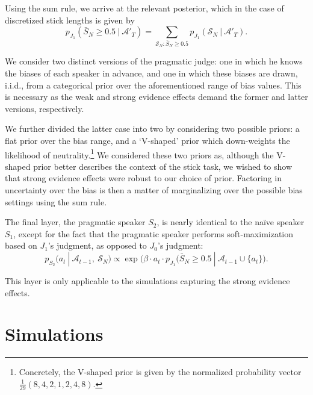\documentclass[10pt,letterpaper]{article}
\begin{document}
Using the sum rule, we arrive at the relevant posterior, which in the case of discretized stick lengths is given by
\begin{equation}
	p_{J_1} ( \bar{S}_N \ge 0.5 \ | \ \mathcal{A}'_T ) = \sum_{\mathcal{S}_N \colon \bar{S}_N \ge 0.5} p_{J_1} (\mathcal{S}_N \ | \ \mathcal{A}'_T).
\end{equation}

We consider two distinct versions of the pragmatic judge: one in which he knows the biases of each speaker in advance, and
one in which these biases are drawn, i.i.d., from a categorical prior over the aforementioned range of bias values. This is 
necessary as the weak and strong evidence effects demand the former and latter versions, respectively. 

We further divided the latter case into two by considering two possible priors: a flat prior over the bias range, and a `V-shaped' prior which down-weights 
the likelihood of neutrality.\footnote{Concretely, the V-shaped prior is given by the normalized probability vector $\frac{1}{29} (8, 4, 2, 1, 2, 4, 8)$.} 
We considered these two priors as, although the V-shaped prior better describes the context of the stick task, we wished to show 
that strong evidence effects were robust to our choice of prior. Factoring in uncertainty over the bias is then a matter of 
marginalizing over the possible bias settings using the sum rule.

The final layer, the pragmatic speaker $S_2$, is nearly identical to the na\"ive speaker $S_1$, except for the fact that
the pragmatic speaker performs soft-maximization based on $J_1$'s judgment, as opposed to $J_0$'s judgment:
\begin{equation}
	p_{S_2} (a_t \ | \ \mathcal{A}_{t-1},\ \mathcal{S}_N) \propto \exp \bigl(\beta \cdot a_t \cdot p_{J_1} (\bar{S}_N \ge 0.5 \ | \ \mathcal{A}_{t-1} \cup \{a_t\} \bigr).
\end{equation}

This layer is only applicable to the simulations capturing the strong evidence effects.

\section{Simulations}
\end{document}
